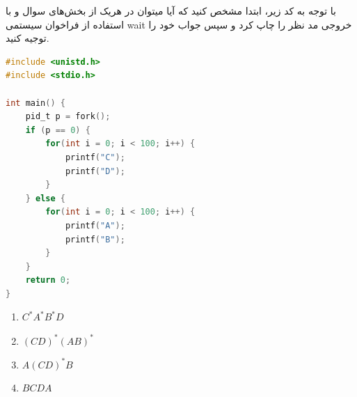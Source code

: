 \question[30] با توجه به کد زیر،‌ ابتدا مشخص کنید که آیا میتوان در هریک از بخش‌های سوال و با استفاده از فراخوان سیستمی wait
خروجی مد نظر را چاپ کرد و سپس جواب خود را توجیه کنید.

\begin{latin}
    \begin{lstlisting}[language=C]
#include <unistd.h>
#include <stdio.h>

int main() {
    pid_t p = fork();
    if (p == 0) {
        for(int i = 0; i < 100; i++) {
            printf("C");
            printf("D");
        }
    } else {
        for(int i = 0; i < 100; i++) {
            printf("A");
            printf("B");
        }
    }
    return 0;
}
\end{lstlisting}
\end{latin}

\begin{enumerate}
    \item $C^* A^* B^* D$
    \item $(CD)^*(AB)^*$
    \item $A(CD)^*B$
    \item $BCDA$
\end{enumerate}